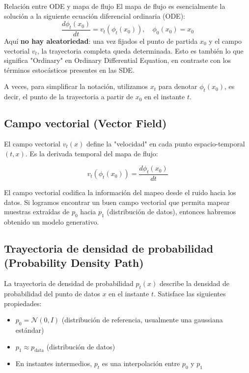 \begin{knowledgebox}{Relación entre ODE y mapa de flujo}
El mapa de flujo es esencialmente la solución a la siguiente ecuación diferencial ordinaria (ODE):
$$\frac{d\phi_t(x_0)}{dt} = v_t(\phi_t(x_0)), \quad \phi_0(x_0) = x_0$$
Aquí \textbf{no hay aleatoriedad}: una vez fijados el punto de partida $x_0$ y el campo vectorial $v_t$, la trayectoria completa queda determinada. Esto es también lo que significa "Ordinary" en Ordinary Differential Equation, en contraste con los términos estocásticos presentes en las SDE.
\end{knowledgebox}

A veces, para simplificar la notación, utilizamos $x_t$ para denotar $\phi_t(x_0)$, es decir, el punto de la trayectoria a partir de $x_0$ en el instante $t$.

\subsection{Campo vectorial (Vector Field)}

El campo vectorial $v_t(x)$ define la "velocidad" en cada punto espacio-temporal $(t, x)$. Es la derivada temporal del mapa de flujo:

$$v_t(\phi_t(x_0)) = \frac{d\phi_t(x_0)}{dt}$$

El campo vectorial codifica la información del mapeo desde el ruido hacia los datos. Si logramos encontrar un buen campo vectorial que permita mapear muestras extraídas de $p_0$ hacia $p_1$ (distribución de datos), entonces habremos obtenido un modelo generativo.

\subsection{Trayectoria de densidad de probabilidad (Probability Density Path)}

La trayectoria de densidad de probabilidad $p_t(x)$ describe la densidad de probabilidad del punto de datos $x$ en el instante $t$. Satisface las siguientes propiedades:
\begin{itemize}
    \item $p_0 = \mathcal{N}(0, I)$ (distribución de referencia, usualmente una gaussiana estándar)
    \item $p_1 \approx p_{\text{data}}$ (distribución de datos)
    \item En instantes intermedios, $p_t$ es una interpolación entre $p_0$ y $p_1$
\end{itemize}

